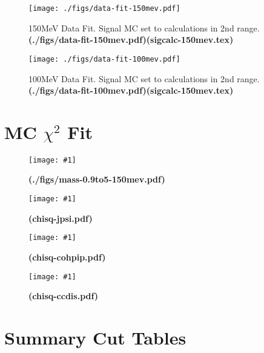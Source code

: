 \documentclass{article}
\newcommand{\addfig}[3]{
\begin{figure}[h!]
\begin{center}
\texttt{[image: \#1]}
\caption{#3   \textbf{(#1)}}
\end{center}
\end{figure}
}
\begin{document}
\clearpage\newpage

\begin{figure}
\begin{minipage}[c]{0.76\textwidth}
    \texttt{[image: ./figs/data-fit-150mev.pdf]}
\end{minipage}%
\begin{minipage}[c]{0.2\textwidth}

\end{minipage}
    \caption{150MeV Data Fit. Signal MC set to calculations in 2nd range. \textbf{(./figs/data-fit-150mev.pdf)(sigcalc-150mev.tex)}}
\end{figure}

\begin{figure}
\begin{minipage}[c]{0.76\textwidth}
    \texttt{[image: ./figs/data-fit-100mev.pdf]}
\end{minipage}%
\begin{minipage}[c]{0.2\textwidth}

\end{minipage}
    \caption{100MeV Data Fit. Signal MC set to calculations in 2nd range. \textbf{(./figs/data-fit-100mev.pdf)(sigcalc-150mev.tex)}}
\end{figure}

\clearpage\newpage
\section{MC $\chi^2$ Fit}

\addfig{./figs/mass-0.9to5-150mev.pdf}{0.8}{}

\clearpage\newpage
\addfig{chisq-jpsi.pdf}{0.7}{}

\clearpage\newpage
\addfig{chisq-cohpip.pdf}{0.7}{}

\clearpage\newpage
\addfig{chisq-ccdis.pdf}{0.7}{}



\clearpage\newpage
\section{Summary Cut Tables}
\end{document}
